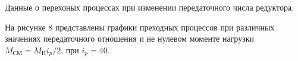 \documentclass[a4paper, 12pt]{article}
\begin{document}
\begin{table}[h!]
    \centering
    \begin{threeparttable}
        \caption{Данные о перехоных процессах при изменении передаточного числа редуктора.}
    \end{threeparttable}
\end{table}

На рисунке 8 представлены графики преходных процессов при различных значениях передаточного отношения и не нулевом моменте нагрузки $M_\text{СМ} = M_\text{Н}i_p/2$, при $i_p = 40$.
\end{document}
